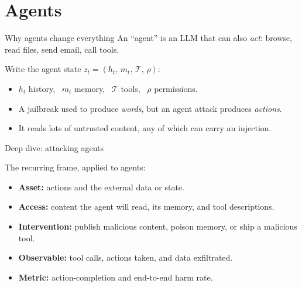 \documentclass[12pt,aspectratio=169,handout]{beamer}
\begin{document}
\section{Agents}

\begin{frame}{Why agents change everything}
An ``agent'' is an LLM that can also \emph{act}: browse, read files, send email, call tools.

\vspace{0.3em}
Write the agent state $z_t = (h_t,\, m_t,\, \mathcal{T},\, \rho)$:
\begin{itemize}
	\setlength{\itemsep}{0.1em}
	\item $h_t$ history, \ $m_t$ memory, \ $\mathcal{T}$ tools, \ $\rho$ permissions.
	\item A jailbreak used to produce \emph{words}, but an agent attack produces \emph{actions}.
	\item It reads lots of untrusted content, any of which can carry an injection.
\end{itemize}

\end{frame}


\begin{frame}{Deep dive: attacking agents}
The recurring frame, applied to agents:
\begin{itemize}\small
	\setlength{\itemsep}{0.15em}
	\item \textbf{Asset:} actions and the external data or state.
	\item \textbf{Access:} content the agent will read, its memory, and tool descriptions.
	\item \textbf{Intervention:} publish malicious content, poison memory, or ship a malicious tool.
	\item \textbf{Observable:} tool calls, actions taken, and data exfiltrated.
	\item \textbf{Metric:} action-completion and end-to-end harm rate.
\end{itemize}

\end{frame}
\end{document}
